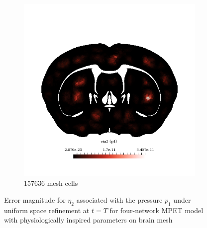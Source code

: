 \begin{figure}[h!]
\begin{subfigure}[b]{0.49\textwidth}
    \includegraphics[width=\textwidth,height=\textheight,keepaspectratio,height=\textheight,keepaspectratio]{figures/4_mpet/biomedical/space/eta2_p1_2.png}
    \caption{157636 mesh cells}
  \end{subfigure}
  \caption{Error magnitude for $\eta_2$ associated with the pressure $p_1$ under uniform space refinement at $t=T$ for four-network MPET model with physiologically inspired parameters on brain mesh} \label{fig:mpet4_eta2_p1}
\end{figure}

